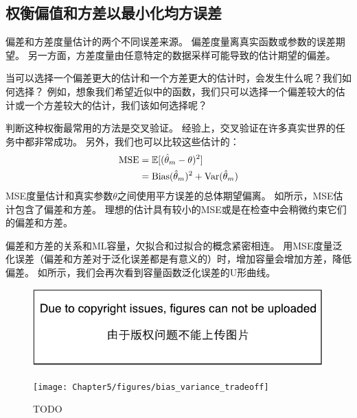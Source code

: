 
\subsection{权衡偏值和方差以最小化均方误差}
\label{sec:trading_off_bias_and_variance_to_minimize_mean_squared_error}
偏差和方差度量估计的两个不同误差来源。
偏差度量离真实函数或参数的误差期望。
另一方面，方差度量由任意特定的数据采样可能导致的估计期望的偏差。

当可以选择一个偏差更大的估计和一个方差更大的估计时，会发生什么呢？我们如何选择？
例如，想象我们希望近似中的函数，我们只可以选择一个偏差较大的估计或一个方差较大的估计，我们该如何选择呢？

判断这种权衡最常用的方法是交叉验证。
经验上，交叉验证在许多真实世界的任务中都非常成功。
另外，我们也可以比较这些估计的：
\begin{align}
    \text{MSE} &= \mathbb{E}[ ( \hat{\theta}_m - \theta  )^2 ] \\
        &= \text{Bias}( \hat{\theta}_m )^2 + \text{Var}( \hat{\theta}_m ) \label{eq:5.54}
\end{align}
MSE度量估计和真实参数$\theta$之间使用平方误差的总体期望偏离。
如所示，MSE估计包含了偏差和方差。
理想的估计具有较小的MSE或是在检查中会稍微约束它们的偏差和方差。

偏差和方差的关系和\gls{ML}容量，欠拟合和过拟合的概念紧密相连。
用MSE度量泛化误差（偏差和方差对于泛化误差都是有意义的）时，增加容量会增加方差，降低偏差。
如所示，我们会再次看到容量函数泛化误差的U形曲线。

\begin{figure}[!htb]
\ifOpenSource
\centerline{\includegraphics{figure.pdf}}
\else
\centerline{\texttt{[image: Chapter5/figures/bias\_variance\_tradeoff]}}
\fi
\caption{TODO}
\label{fig:chap5_bias_variance_tradeoff}
\end{figure}


